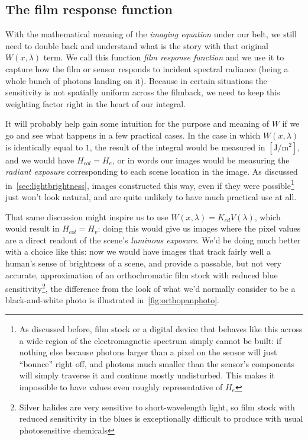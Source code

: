 \subsection{The film response function}\label{sec:filmrespfunc}

With the mathematical meaning of the \textsl{imaging equation} under our belt, 
we still need to double back and understand what is the story with that original $W(x,\lambda)$ term. 
We call this function \textsl{\gls{film response function}} 
and we use it to capture how the film or sensor responds to incident \gls{spectral} \gls{radiance}
(being a whole bunch of photons landing on it). 
Because in certain situations the sensitivity is not spatially uniform across the \gls{filmback}, 
we need to keep this weighting factor right in the heart of our integral.

It will probably help gain some intuition for the purpose and meaning 
of $W$ if we go and see what happens in a few practical cases.
In the case in which $W(x, \lambda)$ is identically equal to $1$, the
result of the integral would be measured in $[\unit{\joule\per\square\meter}]$,
and we would have $H_{col} = H_e$, or in words our images would be measuring the 
\textsl{radiant \gls{exposure}} corresponding to each scene location in the image. 
As discussed in~\cref{sec:lightbrightness}, images constructed this way, even 
if they were possible\footnote{
	As discussed before, film stock or a digital device that behaves like this across a wide region
	of the electromagnetic spectrum simply cannot be built: if nothing else because photons
	larger than a pixel on the sensor will just ``bounce'' right off, and photons much smaller
	than the sensor's components will simply traverse it and continue mostly undisturbed.
	This makes it impossible to have values even roughly representative of $H_e$}  
just won't look natural, and are quite unlikely to have much practical use at all.

That same discussion might inspire us to use $W(x,\lambda) = K_{cd} V(\lambda)$,
which would result in $H_{col} = H_v$: doing this would give us images where the
pixel values are a direct readout of the scene's \textsl{luminous \gls{exposure}}.
We'd be doing much better with a choice like this: now we would have images that track 
fairly well a human's sense of brightness of a scene, 
and provide a passable, but not very accurate, approximation of
an orthochromatic film stock with reduced blue sensitivity\footnote{Silver halides
	are very sensitive to short-wavelength light, so film stock with reduced
	sensitivity in the blues is exceptionally difficult to produce with usual
	photosensitive chemicals}, 
the difference from the look of what we'd normally consider to be a black-and-white
photo is illustrated in~\cref{fig:orthopanphoto}.

